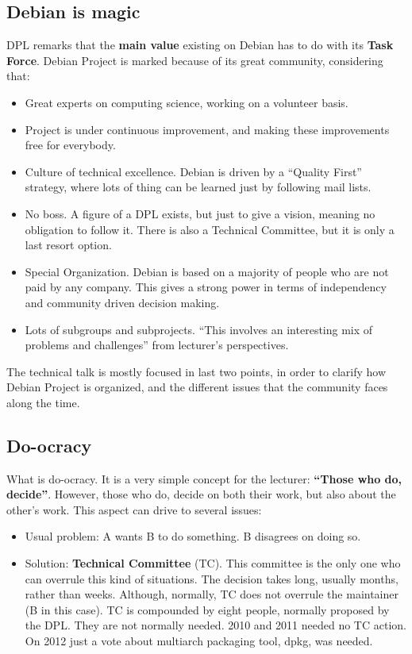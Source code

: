 \documentclass[11pt]{article}
\begin{document}
\subsection{Debian is magic}
DPL remarks that the \textbf{main value} existing on Debian has to do with its \textbf{Task Force}. Debian Project is marked because of its great community, considering that:
\begin{itemize}\itemsep0pt
\item{Great experts on computing science, working on a volunteer basis}.
\item{Project is under continuous improvement, and making these improvements free for everybody}.
\item{Culture of technical excellence.} Debian is driven by a ``Quality First'' strategy, where lots of thing can be learned just by following mail lists.
\item{No boss.} A figure of a DPL exists, but just to give a vision, meaning no obligation to follow it. There is also a Technical Committee, but it is only a last resort option.
\item{Special Organization.} Debian is based on a majority of people who are not paid by any company. This gives a strong power in terms of independency and community driven decision making.
\item{Lots of subgroups and subprojects.} ``This involves an interesting mix of problems and challenges'' from lecturer's perspectives.
\end{itemize}
The technical talk is mostly focused in last two points, in order to clarify how Debian Project is organized, and the different issues that the community faces along the time.

\subsection{Do-ocracy}
What is do-ocracy. It is a very simple concept for the lecturer: \textbf{``Those who do, decide''}. However, those who do, decide on both their work, but also about the other's work. This aspect can drive to several issues:
\begin{itemize}\itemsep0pt
\item{Usual problem}: A wants B to do something. B disagrees on doing so.
\item{Solution}: \textbf{Technical Committee} (TC). This committee is the only one who can overrule this kind of situations. The decision takes long, usually months, rather than weeks. Although, normally, TC does not overrule the maintainer (B in this case). TC is compounded by eight people, normally proposed by the DPL. They are not normally needed. 2010 and 2011 needed no TC action. On 2012 just a vote about multiarch packaging tool, dpkg, was needed.
\end{itemize}
\end{document}
